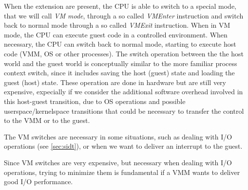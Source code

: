 When the extension are present, the CPU is able to switch to a special mode, that we will call \emph{VM mode}, through a so called
\emph{VMEnter} instruction and switch back to normal mode through a so called \emph{VMExit} instruction.
When in VM mode, the CPU can execute guest code in a controlled environment. When necessary, the CPU can switch back to normal mode, 
starting to execute host code (VMM, OS or other processes).
The switch operation between the the host world and the guest world is conceptually similar to the more familiar process context switch,
since it includes saving the host (guest) state and loading the guest (host) state. These operation are done in hardware but are
still very expensive, expecially if we consider the additional software overhead involved in this host-guest transition, due to
OS operations and possible userspace/kernelspace transitions that could be necessary to transfer the control to the VMM or to the
guest.

The VM switches are necessary in some situations, such as dealing with I/O operations (see \ref{sec:sidt}), or when we want
to deliver an interrupt to the guest.

Since VM switches are very expensive, but necessary when dealing with I/O operations, trying to minimize them is fundamental if a VMM
wants to deliver good I/O performance.





